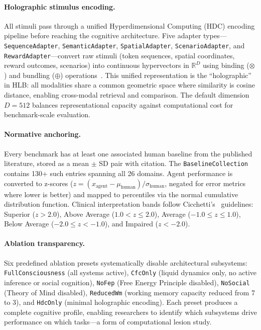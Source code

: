\documentclass[11pt,letterpaper]{article}
\newcommand{\bind}{\otimes}
\newcommand{\bundle}{\oplus}
\newcommand{\hlb}{\textsc{HLB}}
\begin{document}
\paragraph{Holographic stimulus encoding.} All stimuli pass through a unified Hyperdimensional Computing (HDC) encoding pipeline before reaching the cognitive architecture. Five adapter types---\texttt{SequenceAdapter}, \texttt{SemanticAdapter}, \texttt{SpatialAdapter}, \texttt{ScenarioAdapter}, and \texttt{RewardAdapter}---convert raw stimuli (token sequences, spatial coordinates, reward outcomes, scenarios) into continuous hypervectors in $\mathbb{R}^D$ using binding ($\bind$) and bundling ($\bundle$) operations~\citep{kleyko2023survey}. This unified representation is the ``holographic'' in \hlb{}: all modalities share a common geometric space where similarity is cosine distance, enabling cross-modal retrieval and comparison. The default dimension $D = 512$ balances representational capacity against computational cost for benchmark-scale evaluation.

\paragraph{Normative anchoring.} Every benchmark has at least one associated human baseline from the published literature, stored as a mean $\pm$ SD pair with citation. The \texttt{BaselineCollection} contains 130+ such entries spanning all 26 domains. Agent performance is converted to z-scores ($z = (x_{\text{agent}} - \mu_{\text{human}}) / \sigma_{\text{human}}$, negated for error metrics where lower is better) and mapped to percentiles via the normal cumulative distribution function. Clinical interpretation bands follow Cicchetti's~\citep{cicchetti1994guidelines} guidelines: Superior ($z > 2.0$), Above Average ($1.0 < z \leq 2.0$), Average ($-1.0 \leq z \leq 1.0$), Below Average ($-2.0 \leq z < -1.0$), and Impaired ($z < -2.0$).

\paragraph{Ablation transparency.} Six predefined ablation presets systematically disable architectural subsystems: \texttt{FullConsciousness} (all systems active), \texttt{CfcOnly} (liquid dynamics only, no active inference or social cognition), \texttt{NoFep} (Free Energy Principle disabled), \texttt{NoSocial} (Theory of Mind disabled), \texttt{ReducedWm} (working memory capacity reduced from 7 to 3), and \texttt{HdcOnly} (minimal holographic encoding). Each preset produces a complete cognitive profile, enabling researchers to identify which subsystems drive performance on which tasks---a form of computational lesion study.
\end{document}
